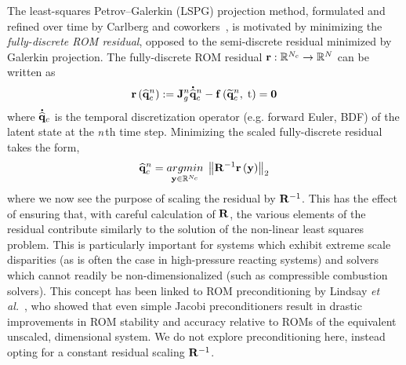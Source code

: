 The least-squares Petrov--Galerkin (LSPG) projection method, formulated and refined over time by Carlberg and coworkers~\cite{Carlberg2010,Carlberg2013,Carlberg2017}, is motivated by minimizing the \textit{fully-discrete ROM residual}, opposed to the semi-discrete residual minimized by Galerkin projection. The fully-discrete ROM residual $\mathbf{r}: \mathbb{R}^{N_c} \rightarrow \mathbb{R}^{N}$ can be written as
%
\begin{equation}
    \mathbf{r}\left(\mathbf{\widehat{q}}_{c}^{n}\right) := \mathbf{J}_{g}^{n} \accentset{\mbox{\large\bfseries .}}{\mathbf{\widehat{q}}}_{c}^{n} - \mathbf{f} \left(\mathbf{\widetilde{q}}_{c}^{n}, \; \text{t}\right) = \mathbf{0}
\end{equation}
%
where $\accentset{\mbox{\large\bfseries .}}{\mathbf{\widehat{q}}}_{c}$ is the temporal discretization operator (e.g. forward Euler, BDF) of the latent state at the $n$th time step. Minimizing the scaled fully-discrete residual takes the form,
%
\begin{equation}\label{eq:lspgLS}
    \consVecCoef^{\timeIdx} = \argmin{\dummyVec \inROne{\numConsModes}} \left\Vert \resScaleInv \resFunc{\dummyVec} \right\Vert_2
\end{equation}
%
where we now see the purpose of scaling the residual by $\resScaleInv$. This has the effect of ensuring that, with careful calculation of $\resScale$, the various elements of the residual contribute similarly to the solution of the non-linear least squares problem. This is particularly important for systems which exhibit extreme scale disparities (as is often the case in high-pressure reacting systems) and solvers which cannot readily be non-dimensionalized (such as compressible combustion solvers). This concept has been linked to ROM preconditioning by Lindsay \textit{et al.}~\cite{Lindsay2022}, who showed that even simple Jacobi preconditioners result in drastic improvements in ROM stability and accuracy relative to ROMs of the equivalent unscaled, dimensional system. We do not explore preconditioning here, instead opting for a constant residual scaling $\resScaleInv$.

